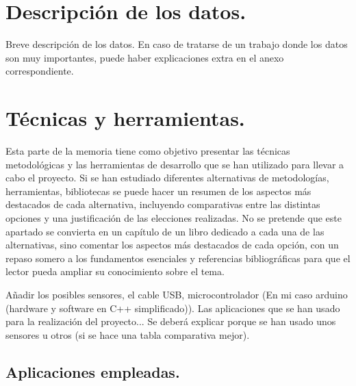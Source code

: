 
\section{Descripción de los datos.}
Breve descripción de los datos.
En caso de tratarse de un trabajo donde los datos son muy importantes, puede haber explicaciones extra en el anexo correspondiente.
 
\section{Técnicas y herramientas.}

Esta parte de la memoria tiene como objetivo presentar las técnicas metodológicas y las herramientas de desarrollo que se han utilizado para llevar a cabo el proyecto. Si se han estudiado diferentes alternativas de metodologías, herramientas, bibliotecas se puede hacer un resumen de los aspectos más destacados de cada alternativa, incluyendo comparativas entre las distintas opciones y una justificación de las elecciones realizadas. 
No se pretende que este apartado se convierta en un capítulo de un libro dedicado a cada una de las alternativas, sino comentar los aspectos más destacados de cada opción, con un repaso somero a los fundamentos esenciales y referencias bibliográficas para que el lector pueda ampliar su conocimiento sobre el tema.

Añadir los posibles sensores, el cable USB, microcontrolador (En mi caso arduino (hardware y software en C++ simplificado)). Las aplicaciones que se han usado para la realización del proyecto... Se deberá explicar porque se han usado unos sensores u otros (si se hace una tabla comparativa mejor). 


\subsection{Aplicaciones empleadas.}

